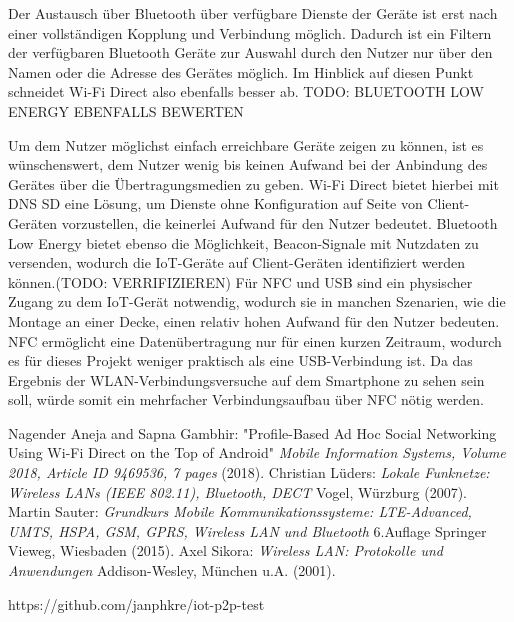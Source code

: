 \documentclass[12pt,a4paper]{article}
\begin{document}
       Der Austausch über Bluetooth über verfügbare Dienste der Geräte ist erst nach einer vollständigen Kopplung und Verbindung möglich.
       Dadurch ist ein Filtern der verfügbaren Bluetooth Geräte zur Auswahl durch den Nutzer nur über den Namen oder die Adresse des Gerätes möglich.
       Im Hinblick auf diesen Punkt schneidet Wi-Fi Direct also ebenfalls besser ab. TODO: BLUETOOTH LOW ENERGY EBENFALLS BEWERTEN

       Um dem Nutzer möglichst einfach erreichbare Geräte zeigen zu können, ist es wünschenswert, dem Nutzer wenig bis keinen Aufwand bei der Anbindung des Gerätes über die Übertragungsmedien zu geben.
       Wi-Fi Direct bietet hierbei mit DNS SD eine Lösung, um Dienste ohne Konfiguration auf Seite von Client-Geräten vorzustellen, die keinerlei Aufwand für den Nutzer bedeutet.
       Bluetooth Low Energy bietet ebenso die Möglichkeit, Beacon-Signale mit Nutzdaten zu versenden, wodurch die IoT-Geräte auf Client-Geräten identifiziert werden können.(TODO: VERRIFIZIEREN)
       Für NFC und USB sind ein physischer Zugang zu dem IoT-Gerät notwendig, wodurch sie in manchen Szenarien, wie die Montage an einer Decke, einen relativ hohen Aufwand für den Nutzer bedeuten.
       NFC ermöglicht eine Datenübertragung nur für einen kurzen Zeitraum, wodurch es für dieses Projekt weniger praktisch als eine USB-Verbindung ist.
       Da das Ergebnis der WLAN-Verbindungsversuche auf dem Smartphone zu sehen sein soll, würde somit ein mehrfacher Verbindungsaufbau über NFC nötig werden.
    \begin{thebibliography}{10}
        Nagender Aneja and Sapna Gambhir: "Profile-Based Ad Hoc Social Networking Using Wi-Fi Direct on the Top of Android" {\it Mobile Information Systems, Volume 2018, Article ID 9469536, 7 pages} (2018).
        Christian Lüders: {\it Lokale Funknetze: Wireless LANs (IEEE 802.11), Bluetooth, DECT} Vogel, Würzburg (2007).
        Martin Sauter: {\it Grundkurs Mobile Kommunikationssysteme: LTE-Advanced, UMTS, HSPA, GSM, GPRS, Wireless LAN und Bluetooth} 6.Auflage Springer Vieweg, Wiesbaden (2015).
        Axel Sikora: {\it Wireless LAN: Protokolle und Anwendungen} Addison-Wesley, München u.A. (2001).

        https://github.com/janphkre/iot-p2p-test
    \end{thebibliography}
\end{document}
